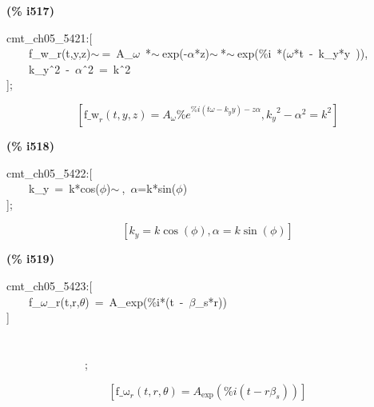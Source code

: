 \documentclass[fleqn]{article}
\begin{document}
\noindent
\begin{minipage}[t]{4.000000em}\color{red}\bfseries
(\% i517)	
\end{minipage}
\begin{minipage}[t]{\textwidth}\color{blue}
cmt\_ch05\_5421:[\\
\ \ \ \ f\_w\_r(t,y,z)\ensuremath{\sim\ }=\ A\_\ensuremath{\omega}\ *\ensuremath{\sim\ }exp(-\ensuremath{\alpha}*z)\ensuremath{\sim\ }*\ensuremath{\sim\ }exp(\%i\ *(\ensuremath{\omega}*t\ -\ k\_y*y\ )),\\
\ \ \ \ k\_y\^\ 2\ -\ \ensuremath{\alpha}\^\ 2\ =\ k\^\ 2\\
];
\end{minipage}
\[\displaystyle \tag{\% o517} 
\left[ {{\ensuremath{\mathrm{f\_ w}}}_r}\left( t\operatorname{,}y\operatorname{,}z\right) ={A_{\omega }} {{\% e}^{\% i \left( t \omega -{k_y} y\right) -z \alpha }}\operatorname{,}{{{k_y}}^{2}}-{{\alpha }^{2}}={{k}^{2}}\right] \mbox{}
\]


\noindent
\begin{minipage}[t]{4.000000em}\color{red}\bfseries
(\% i518)	
\end{minipage}
\begin{minipage}[t]{\textwidth}\color{blue}
cmt\_ch05\_5422:[\\
\ \ \ \ k\_y\ =\ k*cos(\ensuremath{\phi})\ensuremath{\sim\ },\ \ensuremath{\alpha}=k*sin(\ensuremath{\phi})\\
];
\end{minipage}
\[\displaystyle \tag{\% o518} 
\left[ {k_y}=k \cos{\left( \phi \right) }\operatorname{,}\alpha =k \sin{\left( \phi \right) }\right] \mbox{}
\]


\noindent
\begin{minipage}[t]{4.000000em}\color{red}\bfseries
(\% i519)	
\end{minipage}
\begin{minipage}[t]{\textwidth}\color{blue}
cmt\_ch05\_5423:[\\
\ \ \ \ f\_\ensuremath{\omega}\_r(t,r,\ensuremath{\theta})\ =\ A\_exp(\%i*(t\ -\ \ensuremath{\beta}\_s*r))\\
]\ \ \ \ \ \ \ \ \ \ \ \ \ \ \ \ \ \ \ \ \ \ \ \ \ \ \ \ \ \ \ \ \ \ \ \ \ \ \ \ \ \ \ \ \ \ \ \ \ \ \ \ \ \ \ \ \ \ \ \ \ \ \ \ \ \ \ \ \ \ \ \ \ \ \ \ \ \ \ \ \ \ \ \ \ \ \ \ \ \ \ \ \ \ \ \ \ \ \ \ \ \ \ \ \ \ \ \ \ \ \ \ \ \ \ \ \ \ \ \ \ \ \ \ \ \ \ \ \ \ \ \ \ \ \ \ \ \ \ \ \ \ \ \ \ \ \ \ \ \ \ \ \ \ \ \ \ \ \ \ \ \ \ \ \ \ \ \ \ \ \ \ \ \ \ \ \ \ \ \ \ \ \ \ \ \ \ \ \ \ \ \ \ \ \ \ \ \ \ \ \ \ \ \ \ \ \ \ \ \ \ \ \ \ \ \ \ \ \ \ \ \ \ \ \ \ \ \ \ ;
\end{minipage}
\[\displaystyle \tag{\% o519} 
\left[ {{\ensuremath{\mathrm{f\_ \omega }}}_r}\left( t\operatorname{,}r\operatorname{,}\theta \right) ={A_{\ensuremath{\mathrm{exp}}}}\left( \% i \left( t-r {{\beta }_s}\right) \right) \right] \mbox{}
\]
\end{document}

